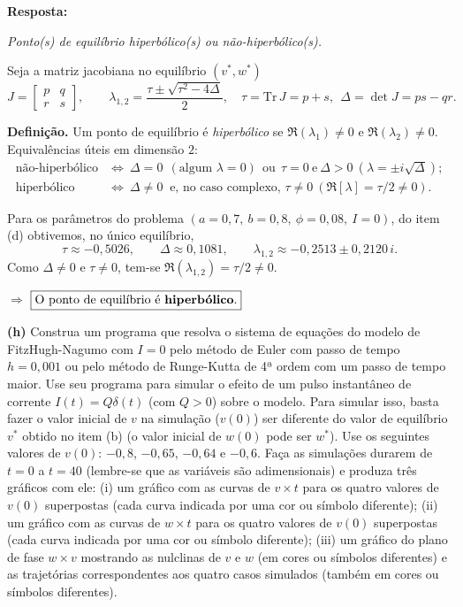 \documentclass[english,11pt,a4paper]{article}
\begin{document}
	\noindent\textbf{Resposta:}
	
	\noindent\textit{Ponto(s) de equilíbrio hiperbólico(s) ou não-hiperbólico(s).}
	
	\noindent Seja a matriz jacobiana no equilíbrio \((v^\ast,w^\ast)\)
	\[
	J=\begin{bmatrix}p & q\\ r & s\end{bmatrix}, 
	\qquad 
	\lambda_{1,2}=\frac{\tau\pm\sqrt{\tau^2-4\Delta}}{2},
	\quad 
	\tau=\mathrm{Tr}\,J=p+s,\ \ \Delta=\det J=ps-qr .
	\]
	
	\noindent \textbf{Definição.} Um ponto de equilíbrio é \emph{hiperbólico} se \(\Re(\lambda_1)\neq 0\) e \(\Re(\lambda_2)\neq 0\). 
	Equivalências úteis em dimensão \(2\):
	\[
	\begin{array}{ll}
		\text{não-hiperbólico} & \Leftrightarrow\ \Delta=0\ \ (\text{algum } \lambda=0)\ \ \text{ou}\ \ \tau=0\ \text{e}\ \Delta>0\ (\lambda=\pm i\sqrt{\Delta});\\[2pt]
		\text{hiperbólico} & \Leftrightarrow\ \Delta\neq 0\ \text{ e, no caso complexo, } \tau\neq 0\ (\Re[\lambda]=\tau/2\neq 0).
	\end{array}
	\]
	
	\noindent Para os parâmetros do problema \((a=0{,}7,\ b=0{,}8,\ \phi=0{,}08,\ I=0)\), do item (d) obtivemos, no único equilíbrio,
	\[
	\tau \approx -0{,}5026,\qquad \Delta \approx 0{,}1081,\qquad 
	\lambda_{1,2}\approx -0{,}2513 \pm 0{,}2120\,i .
	\]
	Como \(\Delta\neq 0\) e \(\tau\neq 0\), tem-se \(\Re(\lambda_{1,2})=\tau/2\neq 0\).
	
	\medskip
	\noindent \(\Rightarrow\) \(\boxed{\text{O ponto de equilíbrio é \textbf{hiperbólico}.}}\)
	
	
	\noindent\textbf{(h)} Construa um programa que resolva o sistema de equações do modelo de FitzHugh-Nagumo com $I = 0$ pelo método de Euler com passo de tempo $h = 0{,}001$ ou pelo método de Runge-Kutta de 4ª ordem com um passo de tempo maior. Use seu programa para simular o efeito de um pulso instantâneo de corrente $I(t) = Q\delta(t)$ (com $Q > 0$) sobre o modelo. Para simular isso, basta fazer o valor inicial de $v$ na simulação ($v(0)$) ser diferente do valor de equilíbrio $v^*$ obtido no item (b) (o valor inicial de $w(0)$ pode ser $w^*$). Use os seguintes valores de $v(0)$: $-0{,}8$, $-0{,}65$, $-0{,}64$ e $-0{,}6$. Faça as simulações durarem de $t = 0$ a $t = 40$ (lembre-se que as variáveis são adimensionais) e produza três gráficos com ele: (i) um gráfico com as curvas de $v \times t$ para os quatro valores de $v(0)$ superpostas (cada curva indicada por uma cor ou símbolo diferente); (ii) um gráfico com as curvas de $w \times t$ para os quatro valores de $v(0)$ superpostas (cada curva indicada por uma cor ou símbolo diferente); (iii) um gráfico do plano de fase $w \times v$ mostrando as nulclinas de $v$ e $w$ (em cores ou símbolos diferentes) e as trajetórias correspondentes aos quatro casos simulados (também em cores ou símbolos diferentes).\\
	
\end{document}
